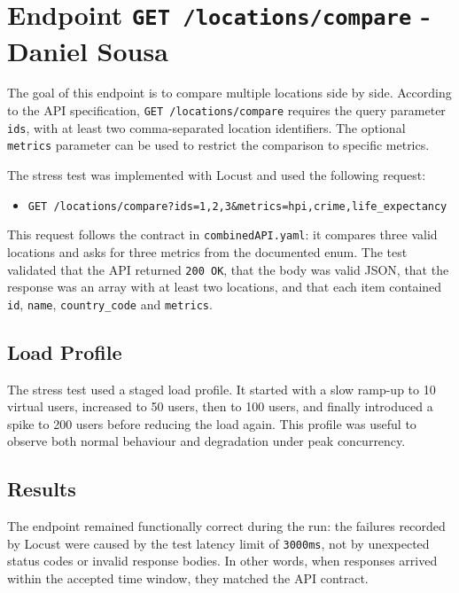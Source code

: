 \section{Endpoint \texttt{GET /locations/compare} - Daniel Sousa}

The goal of this endpoint is to compare multiple locations side by side. According to the API specification, \texttt{GET /locations/compare} requires the query parameter \texttt{ids}, with at least two comma-separated location identifiers. The optional \texttt{metrics} parameter can be used to restrict the comparison to specific metrics.

The stress test was implemented with Locust and used the following request:

\begin{itemize}
    \item \texttt{GET /locations/compare?ids=1,2,3\&metrics=hpi,crime,life\_expectancy}
\end{itemize}

This request follows the contract in \texttt{combinedAPI.yaml}: it compares three valid locations and asks for three metrics from the documented enum. The test validated that the API returned \texttt{200 OK}, that the body was valid JSON, that the response was an array with at least two locations, and that each item contained \texttt{id}, \texttt{name}, \texttt{country\_code} and \texttt{metrics}.

\subsection{Load Profile}

The stress test used a staged load profile. It started with a slow ramp-up to 10 virtual users, increased to 50 users, then to 100 users, and finally introduced a spike to 200 users before reducing the load again. This profile was useful to observe both normal behaviour and degradation under peak concurrency.

\subsection{Results}

The endpoint remained functionally correct during the run: the failures recorded by Locust were caused by the test latency limit of \texttt{3000ms}, not by unexpected status codes or invalid response bodies. In other words, when responses arrived within the accepted time window, they matched the API contract.

